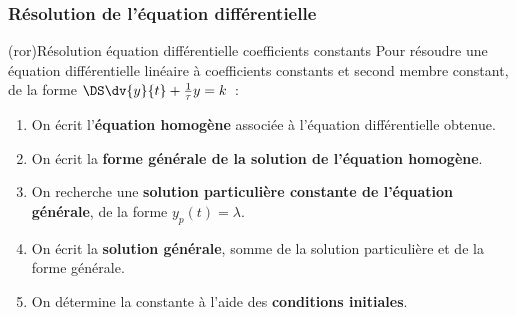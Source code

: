 \documentclass[../../main/main.tex]{subfiles}
\begin{document}
\subsubsection{Résolution de l'équation différentielle}
\begin{tcb*}[label=impo:eqres,
		list entry={\lte\theror~:~Résolution equa.\ diff.\ ordre 1}]
	(ror){Résolution équation différentielle coefficients constants}
	Pour résoudre une équation différentielle linéaire à
	coefficients constants et second membre constant, de la forme
	$\DS \dv{y}{t} + \frac{1}{\tau}y = k$~:
	\begin{enumerate}[label=\sqenumi]
		\item On écrit l'\textbf{équation homogène} associée à
		      l'équation différentielle obtenue.
		\item On écrit la \textbf{forme générale de la solution de
			      l'équation homogène}.
		\item On recherche une \textbf{solution particulière
			      constante de l'équation générale}, de la forme $y_p(t) =
			      \lambda$.
		\item On écrit la \textbf{solution générale}, somme de la
		      solution particulière et de la forme générale.
		\item On détermine la constante à l'aide des
		      \textbf{conditions initiales}.
	\end{enumerate}
\end{tcb*}
\end{document}

